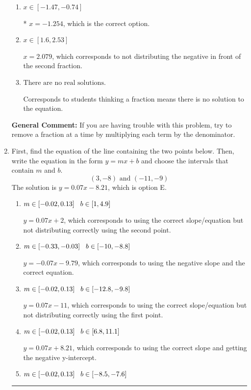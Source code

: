 \documentclass{extbook}[14pt]
\newcommand{\litem}[1]{\item #1

\rule{\textwidth}{0.4pt}}
\begin{document}
\begin{enumerate}
{\begin{enumerate}[label=\Alph*.]
 $x = -4.000$, which corresponds to dividing the coefficients in front of x by the denominator rather than dividing BOTH parts of the numerator by the denominator (or removing the fractions through multiplication).
\item \( x \in [-1.47, -0.74] \)

* $x = -1.254$, which is the correct option.
\item \( x \in [1.6, 2.53] \)

 $x = 2.079$, which corresponds to not distributing the negative in front of the second fraction.
\item \( \text{There are no real solutions.} \)

Corresponds to students thinking a fraction means there is no solution to the equation.
\end{enumerate}

\textbf{General Comment:} If you are having trouble with this problem, try to remove a fraction at a time by multiplying each term by the denominator.
}
\litem{
First, find the equation of the line containing the two points below. Then, write the equation in the form $ y=mx+b $ and choose the intervals that contain $m$ and $b$.
\[ (3, -8) \text{ and } (-11, -9) \]The solution is \( y = 0.07x -8.21 \), which is option E.\begin{enumerate}[label=\Alph*.]
\item \( m \in [-0.02, 0.13] \hspace*{3mm} b \in [1, 4.9] \)

 $y = 0.07x + 2$, which corresponds to using the correct slope/equation but not distributing correctly using the second point.
\item \( m \in [-0.33, -0.03] \hspace*{3mm} b \in [-10, -8.8] \)

 $y = -0.07x -9.79$, which corresponds to using the negative slope and the correct equation.
\item \( m \in [-0.02, 0.13] \hspace*{3mm} b \in [-12.8, -9.8] \)

 $y = 0.07x -11$, which corresponds to using the correct slope/equation but not distributing correctly using the first point.
\item \( m \in [-0.02, 0.13] \hspace*{3mm} b \in [6.8, 11.1] \)

 $y = 0.07x + 8.21$, which corresponds to using the correct slope and getting the negative y-intercept.
\item \( m \in [-0.02, 0.13] \hspace*{3mm} b \in [-8.5, -7.6] \)


\end{enumerate}}
\end{enumerate}
\end{document}
